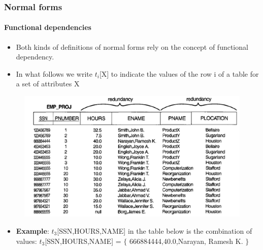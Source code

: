 \documentclass{beamer}
\newcommand{\valseq}[1]{$\lbrace$ #1 $\rbrace$}
\newcommand{\tuple}[2]{$t_{#1}$[#2]}
\begin{document}
\begin{frame}
	\frametitle{Normal forms}
	\framesubtitle{Functional dependencies}
	\begin{itemize}
		\item Both kinds of definitions of normal forms rely on the concept of functional dependency.
		\item In what follows we write \tuple{i}{X} to indicate the values of the row i of a table for a set of attributes X
     \end{itemize}
	\begin{figure}
		\includegraphics[scale=0.4]{img/normalization/norm5}
	\end{figure}
	\begin{itemize}
		\item \textbf{Example}: \tuple{3}{SSN,HOURS,NAME} in the table below is the combination of values: 
		\pause
		\tuple{3}{SSN,HOURS,NAME} = \valseq{666884444,40.0,Narayan, Ramesh K.}
	\end{itemize}
\end{frame}
\end{document}
